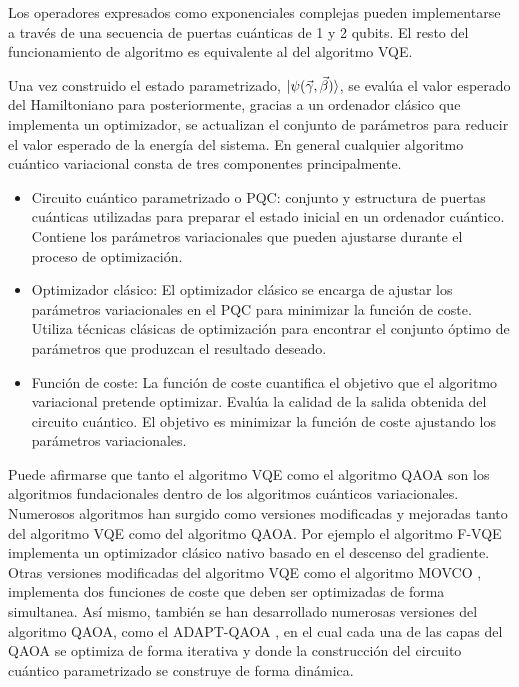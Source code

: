 Los operadores expresados como exponenciales complejas pueden implementarse a través de una secuencia de puertas cuánticas de 1 y 2 qubits. El resto del funcionamiento de algoritmo es equivalente al del algoritmo VQE. 

\newpage

Una vez construido el estado parametrizado, $\ket{\psi(\Vec{\gamma}, \Vec{\beta})}$, se evalúa el valor esperado del Hamiltoniano para posteriormente, gracias a un ordenador clásico que implementa un optimizador, se actualizan el conjunto de parámetros para reducir el valor esperado de la energía del sistema. En general cualquier algoritmo cuántico variacional consta de tres componentes principalmente. 

\begin{itemize}
    
    \item Circuito cuántico parametrizado o PQC: conjunto y estructura de puertas cuánticas utilizadas para preparar el estado inicial en un ordenador cuántico. Contiene los parámetros variacionales que pueden ajustarse durante el proceso de optimización.

    \item Optimizador clásico: El optimizador clásico se encarga de ajustar los parámetros variacionales en el PQC para minimizar la función de coste. Utiliza técnicas clásicas de optimización para encontrar el conjunto óptimo de parámetros que produzcan el resultado deseado.

    \item Función de coste: La función de coste cuantifica el objetivo que el algoritmo variacional pretende optimizar. Evalúa la calidad de la salida obtenida del circuito cuántico. El objetivo es minimizar la función de coste ajustando los parámetros variacionales.
    
\end{itemize}

Puede afirmarse que tanto el algoritmo VQE como el algoritmo QAOA son los algoritmos fundacionales dentro de los algoritmos cuánticos variacionales. Numerosos algoritmos han surgido como versiones modificadas y mejoradas tanto del algoritmo VQE como del algoritmo QAOA. Por ejemplo el algoritmo F-VQE \citep{amaro} implementa un optimizador clásico nativo basado en el descenso del gradiente. Otras versiones modificadas del algoritmo VQE como el algoritmo MOVCO \citep{luis}, implementa dos funciones de coste que deben ser optimizadas de forma simultanea. Así mismo, también se han desarrollado numerosas versiones del algoritmo QAOA, como el ADAPT-QAOA \citep{zhu}, en el cual cada una de las capas del QAOA se optimiza de forma iterativa y donde la construcción del circuito cuántico parametrizado se construye de forma dinámica. \\


